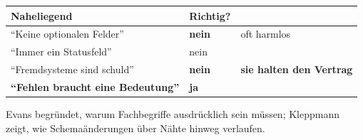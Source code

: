 \begin{warnung}
\begin{center}
\renewcommand{\arraystretch}{1.5}
\begin{tabular}{@{}P{3.2cm}P{2.2cm}P{2.4cm}@{}}
\toprule
\textbf{Naheliegend} & \textbf{Richtig?} & \\
\midrule
\enquote{Keine optionalen Felder} & \textcolor{akzent}{\textbf{nein}} & \textcolor{akzent}{oft harmlos}\\
\enquote{Immer ein Statusfeld} & \textcolor{akzent}{nein} & \\
\enquote{Fremdsysteme sind schuld} & \textcolor{akzent}{\textbf{nein}} & \textbf{sie halten den Vertrag}\\
\textbf{\enquote{Fehlen braucht eine Bedeutung}} & \textcolor{gruen}{\textbf{ja}} & \\
\bottomrule
\end{tabular}
\end{center}

\begin{center}
\begin{minipage}{0.88\textwidth}
\end{minipage}
\end{center}

\begin{center}
\end{center}
\end{warnung}
\vspace{-4pt}
\noindent Evans begründet, warum Fach\-be\-grif\-fe aus\-drück\-lich sein müssen; Klepp\-mann zeigt, wie Sche\-ma\-än\-de\-run\-gen über Nähte hinweg ver\-lau\-fen.
